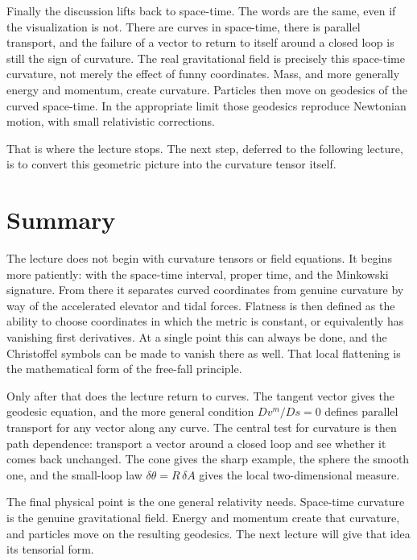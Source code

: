 Finally the discussion lifts back to space-time. The words are the same, even if the visualization is not. There are curves in space-time, there is parallel transport, and the failure of a vector to return to itself around a closed loop is still the sign of curvature. The real gravitational field is precisely this space-time curvature, not merely the effect of funny coordinates. Mass, and more generally energy and momentum, create curvature. Particles then move on geodesics of the curved space-time. In the appropriate limit those geodesics reproduce Newtonian motion, with small relativistic corrections.

That is where the lecture stops. The next step, deferred to the following lecture, is to convert this geometric picture into the curvature tensor itself.

\section{Summary}

The lecture does not begin with curvature tensors or field equations. It begins more patiently: with the space-time interval, proper time, and the Minkowski signature. From there it separates curved coordinates from genuine curvature by way of the accelerated elevator and tidal forces. Flatness is then defined as the ability to choose coordinates in which the metric is constant, or equivalently has vanishing first derivatives. At a single point this can always be done, and the Christoffel symbols can be made to vanish there as well. That local flattening is the mathematical form of the free-fall principle.

Only after that does the lecture return to curves. The tangent vector gives the geodesic equation, and the more general condition \(D v^{m}/Ds=0\) defines parallel transport for any vector along any curve. The central test for curvature is then path dependence: transport a vector around a closed loop and see whether it comes back unchanged. The cone gives the sharp example, the sphere the smooth one, and the small-loop law \(\delta\theta=R\,\delta A\) gives the local two-dimensional measure.

The final physical point is the one general relativity needs. Space-time curvature is the genuine gravitational field. Energy and momentum create that curvature, and particles move on the resulting geodesics. The next lecture will give that idea its tensorial form.
